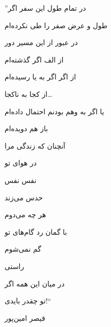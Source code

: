 \begin{center}
	{\Huge \besm }
	
	
	{
	{\large ''}در تمام طول این سفر اگر
		
		طول و عرض صفر را طی نکرده‌ام
		
		در عبور از این مسیر دور
		
		از الف اگر گذشته‌ام
		
		از اگر اگر به یا رسیده‌ام
		
		از کجا به ناکجا…
		
		یا اگر به وهم بودنم	احتمال داده‌ام
		
		باز هم دویده‌ام
		
		آنچنان که زندگی مرا
		
		در هوای تو
		
		نفس نفس
		
		حدس می‌زند
		
		هر چه می‌دوم
		
		با گمان رد گام‌های تو
		
		گم نمی‌شوم
		
		راستی
		
		در میان این همه اگر
		
		تو چقدر بایدی!{\large ``}
	}	
\end{center}

\begin{flushleft}
	{
	قیصر امین‌پور
}
\end{flushleft}




